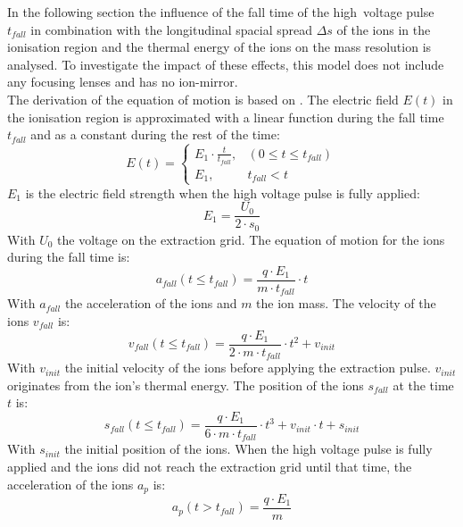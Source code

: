 	In the following section the influence of the fall time of the high~voltage pulse $t_{fall}$ in combination with the longitudinal spacial spread $\Delta s$ of the ions in the ionisation region and the thermal energy of the ions on the mass resolution is analysed. To investigate the impact of these effects, this model does not include any focusing lenses and has no ion-mirror.\\
	The derivation of the equation of motion is based on \cite{Diss_Abplanalp}. The electric field $E(t)$ in the ionisation region is approximated with a linear function during the fall time $t_{fall}$ and as a constant during the rest of the time:
	\begin{equation}
		E(t) =
		\begin{cases}
			E_1\cdot\frac{t}{t_{fall}},& (0\leq t\leq t_{fall})\\
			E_1,& t_{fall} < t
		\end{cases}
	\label{eq:PulseEt}
	\end{equation}
	$E_1$ is the electric field strength when the high voltage pulse is fully applied:
	\begin{equation}
		E_1 = \frac{U_0}{2\cdot s_0}
	\end{equation}
	With $U_0$ the voltage on the extraction grid. The equation of motion for the ions during the fall time is:
	\begin{equation}
		a_{fall}(t\leq t_{fall}) = \frac{q\cdot E_1}{m\cdot t_{fall}}\cdot t
		\label{eq:afall}
	\end{equation}
	With $a_{fall}$ the acceleration of the ions and $m$ the ion mass. The velocity of the ions $v_{fall}$ is:
	\begin{equation}
		v_{fall}(t\leq t_{fall}) = \frac{q\cdot E_1}{2\cdot m\cdot t_{fall}}\cdot t^2 + v_{init}\label{eq:vfall}
	\end{equation}
	With $v_{init}$ the initial velocity of the ions before applying the extraction pulse. $v_{init}$ originates from the ion's thermal energy. The position of the ions $s_{fall}$ at the time $t$ is:
	\begin{equation}
		s_{fall}(t\leq t_{fall}) = \frac{q\cdot E_1}{6\cdot m\cdot t_{fall}}\cdot t^3 + v_{init}\cdot t + s_{init}
		\label{eq:sfall}
	\end{equation}
	With $s_{init}$ the initial position of the ions. When the high voltage pulse is fully applied and the ions did not reach the extraction grid until that time, the acceleration of the ions $a_{p}$ is:
	\begin{equation}
		a_{p}(t > t_{fall}) = \frac{q\cdot E_1}{m}
		\label{eq:ap}
	\end{equation}
